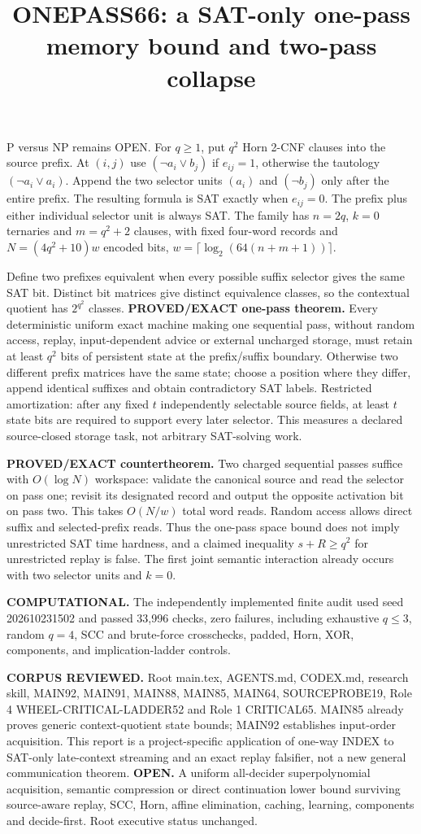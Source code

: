 \documentclass{article}
\title{ONEPASS66: a SAT-only one-pass memory bound and two-pass collapse}
\begin{document}
\maketitle
P versus NP remains OPEN.
For $q\ge1$, put $q^2$ Horn 2-CNF clauses into the source prefix. At $(i,j)$ use $(\neg a_i\vee b_j)$ if $e_{ij}=1$, otherwise the tautology $(\neg a_i\vee a_i)$. Append the two selector units $(a_i)$ and $(\neg b_j)$ only after the entire prefix. The resulting formula is SAT exactly when $e_{ij}=0$. The prefix plus either individual selector unit is always SAT. The family has $n=2q$, $k=0$ ternaries and $m=q^2+2$ clauses, with fixed four-word records and $N=(4q^2+10)w$ encoded bits, $w=\lceil\log_2(64(n+m+1))\rceil$.

Define two prefixes equivalent when every possible suffix selector gives the same SAT bit. Distinct bit matrices give distinct equivalence classes, so the contextual quotient has $2^{q^2}$ classes.
\textbf{PROVED/EXACT one-pass theorem.} Every deterministic uniform exact machine making one sequential pass, without random access, replay, input-dependent advice or external uncharged storage, must retain at least $q^2$ bits of persistent state at the prefix/suffix boundary. Otherwise two different prefix matrices have the same state; choose a position where they differ, append identical suffixes and obtain contradictory SAT labels. Restricted amortization: after any fixed $t$ independently selectable source fields, at least $t$ state bits are required to support every later selector. This measures a declared source-closed storage task, not arbitrary SAT-solving work.

\textbf{PROVED/EXACT countertheorem.} Two charged sequential passes suffice with $O(\log N)$ workspace: validate the canonical source and read the selector on pass one; revisit its designated record and output the opposite activation bit on pass two. This takes $O(N/w)$ total word reads. Random access allows direct suffix and selected-prefix reads. Thus the one-pass space bound does not imply unrestricted SAT time hardness, and a claimed inequality $s+R\ge q^2$ for unrestricted replay is false. The first joint semantic interaction already occurs with two selector units and $k=0$.

\textbf{COMPUTATIONAL.} The independently implemented finite audit used seed 202610231502 and passed 33,996 checks, zero failures, including exhaustive $q\le3$, random $q=4$, SCC and brute-force crosschecks, padded, Horn, XOR, components, and implication-ladder controls.

\textbf{CORPUS REVIEWED.} Root main.tex, AGENTS.md, CODEX.md, research skill, MAIN92, MAIN91, MAIN88, MAIN85, MAIN64, SOURCEPROBE19, Role 4 WHEEL-CRITICAL-LADDER52 and Role 1 CRITICAL65. MAIN85 already proves generic context-quotient state bounds; MAIN92 establishes input-order acquisition. This report is a project-specific application of one-way INDEX to SAT-only late-context streaming and an exact replay falsifier, not a new general communication theorem.
\textbf{OPEN.} A uniform all-decider superpolynomial acquisition, semantic compression or direct continuation lower bound surviving source-aware replay, SCC, Horn, affine elimination, caching, learning, components and decide-first. Root executive status unchanged.
\end{document}
